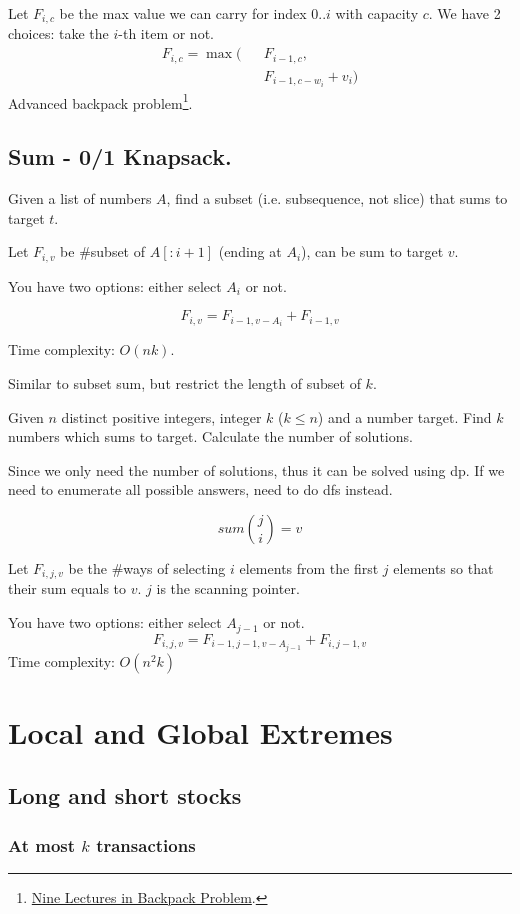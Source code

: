 Let $F_{i, c}$ be the max value we can carry for index $0..i$ with capacity $c$. We have 2 choices: take the $i$-th item or not.
\begin{eqnarray*}
F_{i, c}= \max\big(&&F_{i-1, c}, \\
&&F_{i-1, c-w_i}+v_i\big)
\end{eqnarray*}
Advanced backpack problem\footnote{\href{http://github.com/tianyicui/pack}{Nine Lectures in Backpack Problem}.}. 

\subsection{Sum - 0/1 Knapsack.} 
 Given a list of numbers $A$, find a subset (i.e. subsequence, not slice) that sums to target $t$.

Let $F_{i, v}$ be \#subset of $A[:i+1]$ (ending at $A_i$), can be sum to target $v$.

You have two options: either select $A_i$ or not.
 
$$
F_{i, v} = F_{i-1, v-A_{i}} + F_{i-1, v}
$$

Time complexity: $O(nk)$.

 Similar to subset sum, but restrict the length of subset of $k$.

Given $n$ distinct positive integers, integer $k$ ($k \leq n$) and a number target. Find $k$ numbers which sums to target. Calculate the number of solutions. 

Since we only need the number of solutions, thus it can be solved using dp. If we need to enumerate all possible answers, need to do dfs instead. 

$$
sum{j \choose i} = v
$$

Let $F_{i, j, v}$ be the \#ways of selecting $i$ elements from the first $j$ elements so that their sum equals to $v$. $j$ is the scanning pointer.

You have two options: either select $A_{j-1}$ or not.
$$
F_{i, j, v} = F_{i-1, j-1, v-A_{j-1}} + F_{i, j-1, v}
$$
Time complexity: $O(n^2 k)$
\section{Local and Global Extremes}
\subsection{Long and short stocks}
\subsubsection{At most $k$ transactions}


